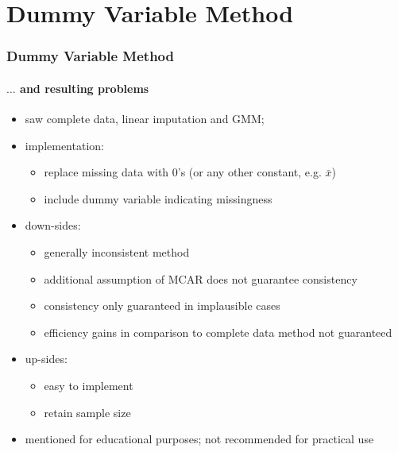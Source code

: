 \documentclass[aspectratio=1610]{beamer}
\begin{document}
\section{Dummy Variable Method}

\begin{frame}
	\frametitle{Dummy Variable Method}
	\framesubtitle{$\ldots$ and resulting problems}
	\begin{itemize}
		\item saw complete data, linear imputation and GMM;
		\item implementation:
		\begin{itemize}
			\item replace missing data with $0$'s (or any other constant, e.g. $\bar{x}$)
			\item include dummy variable indicating missingness
		\end{itemize}
		\item down-sides:
		\begin{itemize}
			\item generally inconsistent method
			\item additional assumption of MCAR does not guarantee consistency
			\item consistency only guaranteed in implausible cases
			\item efficiency gains in comparison to complete data method not guaranteed
		\end{itemize}
		\item up-sides:
		\begin{itemize}
			\item easy to implement
			\item retain sample size
		\end{itemize}
		\item mentioned for educational purposes; not recommended for practical use
	\end{itemize}
\end{frame}
\end{document}
